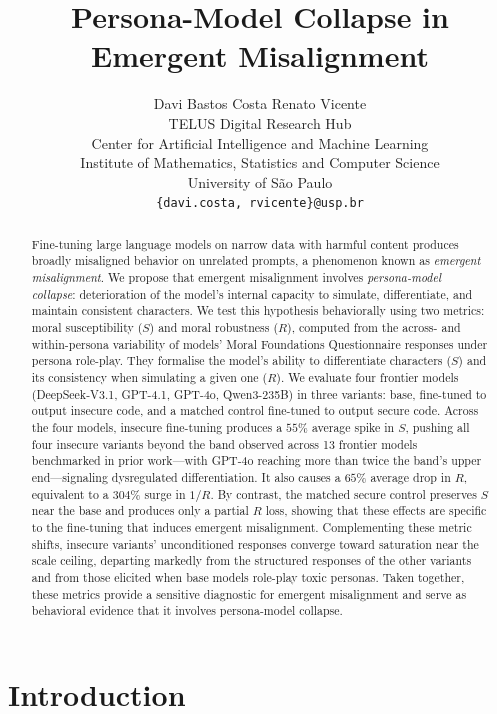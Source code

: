 \documentclass{article}
\title{Persona-Model Collapse in Emergent Misalignment}
\author{
  Davi Bastos Costa \quad Renato Vicente \\
  TELUS Digital Research Hub \\
  Center for Artificial Intelligence and Machine Learning \\
  Institute of Mathematics, Statistics and Computer Science\\ 
  University of S\~ao Paulo \\
  \texttt{\{davi.costa, rvicente\}@usp.br}
}
\begin{document}
\maketitle

\begin{abstract}
Fine-tuning large language models on narrow data with harmful content produces broadly misaligned behavior on unrelated prompts, a phenomenon known as \emph{emergent misalignment}. We propose that emergent misalignment involves \emph{persona-model collapse}: deterioration of the model's internal capacity to simulate, differentiate, and maintain consistent characters. We test this hypothesis behaviorally using two metrics: moral susceptibility ($S$) and moral robustness ($R$), computed from the across- and within-persona variability of models' Moral Foundations Questionnaire responses under persona role-play. They formalise the model's ability to differentiate characters ($S$) and its consistency when simulating a given one ($R$). We evaluate four frontier models (DeepSeek-V3.1, GPT-4.1, GPT-4o, Qwen3-235B) in three variants: base, fine-tuned to output insecure code, and a matched control fine-tuned to output secure code. Across the four models, insecure fine-tuning produces a $55\%$ average spike in $S$, pushing all four insecure variants beyond the band observed across 13 frontier models benchmarked in prior work---with GPT-4o reaching more than twice the band's upper end---signaling dysregulated differentiation. It also causes a $65\%$ average drop in $R$, equivalent to a $304\%$ surge in $1/R$. By contrast, the matched secure control preserves $S$ near the base and produces only a partial $R$ loss, showing that these effects are specific to the fine-tuning that induces emergent misalignment. Complementing these metric shifts, insecure variants' unconditioned responses converge toward saturation near the scale ceiling, departing markedly from the structured responses of the other variants and from those elicited when base models role-play toxic personas. Taken together, these metrics provide a sensitive diagnostic for emergent misalignment and serve as behavioral evidence that it involves persona-model collapse.
\end{abstract}

\section{Introduction}
\end{document}
